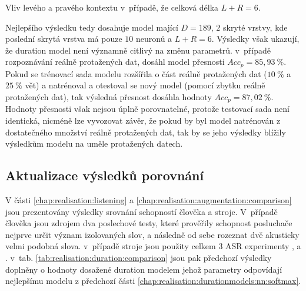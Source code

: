 \begin{table}[htpb]
  \centering
  \def\arraystretch{1.5}
  \caption{Vliv levého a pravého kontextu v~případě, že celková délka $L + R = 6$.}
  \label{tab:realisation:duration:context:asymetric}
\end{table}

Nejlepšího výsledku tedy dosahuje model mající $D = 189$, $2$ skryté vrstvy, kde poslední skrytá vrstva má pouze $10$ neuronů a $L + R = 6$. Výsledky však ukazují, že duration model není významně citlivý na změnu parametrů. v~případě rozpoznávání reálně protažených dat, dosáhl model přesnosti $Acc_{p} = 85,93\ \%$. Pokud se trénovací sada modelu rozšířila o část reálně protažených dat ($10\ \%$ a $25\ \%$ vět) a natrénoval a otestoval se nový model (pomocí zbytku reálně protažených dat), tak výsledná přesnost dosáhla hodnoty $Acc_{p} = 87,02\ \%$. Hodnoty přesnosti však nejsou úplně porovnatelné, protože testovací sada není identická, nicméně lze vyvozovat závěr, že pokud by byl model natrénován z dostatečného množství reálně protažených dat, tak by se jeho výsledky blížily výsledkům modelu na uměle protažených datech.


\subsection{Aktualizace výsledků porovnání}
\label{chap:realisation:duration:comparison}

V části \ref{chap:realisation:listening} a \ref{chap:realisation:augmentation:comparison} jsou prezentovány výsledky srovnání schopností člověka a stroje. V~případě člověka jsou zdrojem dva poslechové testy, které prověřily schopnost posluchače nejprve určit význam izolovaných slov, a následně od sebe rozeznat dvě akusticky velmi podobná slova. v~případě stroje jsou použity celkem $3$ ASR experimenty ,  a . v~tab. \ref{tab:realisation:duration:comparison} jsou pak předchozí výsledky doplněny o hodnoty dosažené duration modelem jehož parametry odpovídají nejlepšímu modelu z předchozí části \ref{chap:realisation:durationmodels:nn:softmax}.

